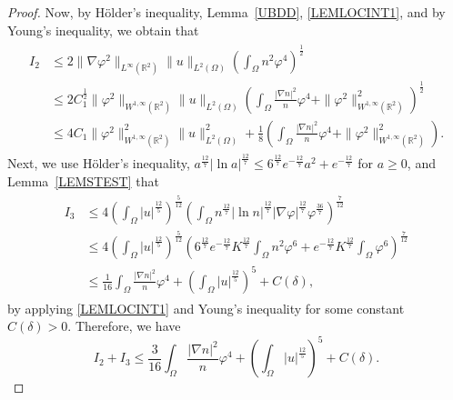 \documentclass{amsart}
\numberwithin{equation}{section}
\newcommand{\R}{{ \mathbb{R}  }}
\newcommand{\bke}[1]{\left( #1 \right)}
\begin{document}
\begin{proof}
Now, by H\"{o}lder's inequality, Lemma~\ref{UBDD}, \eqref{LEMLOCINT1}, and by Young's inequality, we obtain that 
\begin{align*}
\begin{aligned}
I_2
&\le 2\|\nabla \varphi^{2} \|_{L^{\infty}(\R^{2})}\|u\|_{L^{2}(\Omega)}\bke{\int_{\Omega}n^{2}\varphi^{4}}^{\frac{1}{2}}
\\& \le 2 C_{1}^{\frac{1}{2}} \| \varphi^{2}  \|_{W^{1,\infty}(\R^{2})}\|u\|_{L^{2}(\Omega)} \bke{  \int_{\Omega} \frac{|\nabla n|^{2}}{n}\varphi^{4}  +\| \varphi^{2}  \|_{W^{1,\infty}(\R^{2})}^{2}}^{\frac{1}{2}} 
\\& \le 4 C_1\| \varphi^{2}  \|_{W^{1,\infty}(\R^{2})}^{2}\|u\|_{L^{2}(\Omega)}^{2}   +\frac{1}{8}\bke{  \int_{\Omega} \frac{|\nabla n|^{2}}{n}\varphi^{4}  +\| \varphi^{2}  \|_{W^{1,\infty}(\R^{2})}^{2}}. 
\end{aligned}
\end{align*}
Next, we use H\"older's  inequality, $a^{\frac{12}{7}}|\ln a|^{\frac{12}{7}}\le 6^{\frac{12}{7}}e^{-\frac{12}{7}} a^{2}+e^{-\frac{12}{7}}$ for $a\ge0$, and Lemma~\ref{LEMSTEST} that 
\begin{align*}
\begin{aligned}
I_3
&\le 4\bke{\int_{\Omega} |u|^{\frac{12}{5}}}^{\frac{5}{12}}\bke{\int_{\Omega}n^{\frac{12}{7}}|\ln n|^{\frac{12}{7}} |\nabla \varphi|^{\frac{12}{7}} \varphi^{\frac{36}{7}}  }^{\frac{7}{12}}
\\ &\le 4\bke{\int_{\Omega} |u|^{\frac{12}{5}}}^{\frac{5}{12}}\bke{6^{\frac{12}{7}}e^{-\frac{12}{7}}K^{\frac{12}{7}}\int_{\Omega}n^{2}  \varphi^{6}  +e^{-\frac{12}{7}}K^{\frac{12}{7}}\int_{\Omega}   \varphi^{6}}^{\frac{7}{12}}
\\ &\le \frac{1}{16}\int_{\Omega} \frac{|\nabla n|^{2}}{n}\varphi^{4}+\bke{\int_{\Omega} |u|^{\frac{12}{5}}}^{5}+C(\delta),
\end{aligned}
\end{align*}
by applying \eqref{LEMLOCINT1} and Young's inequality for some constant $C(\delta)>0$. 
Therefore, we have 
\begin{equation}\label{I2+I3}
I_2 + I_3 \leq \frac{3}{16}\int_{\Omega} \frac{|\nabla n|^{2}}{n}\varphi^{4}+\bke{\int_{\Omega} |u|^{\frac{12}{5}}}^{5}+C(\delta).
\end{equation}


\end{proof}
\end{document}
